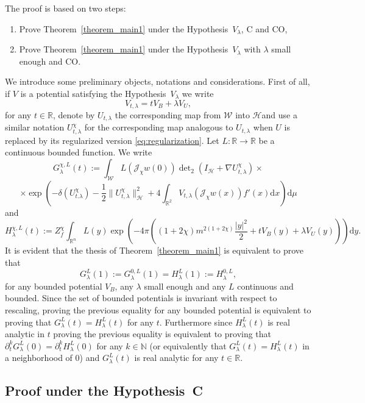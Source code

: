 \documentclass[a4paper,10pt]{article}
\newcommand{\assign}{:=}
\newcommand{\mathd}{\mathrm{d}}
\begin{document}
The proof is based on two steps:
\begin{enumerate}
  \item Prove Theorem~\ref{theorem_main1} under the Hypothesis~$V_{\lambda}$,
  C and CO,
  
  \item Prove Theorem~\ref{theorem_main1} under the Hypothesis~$V_{\lambda}$
  with $\lambda$ small enough and CO.
\end{enumerate}
We introduce some preliminary objects, notations and considerations. First of
all, if $V$ is a potential satisfying the Hypothesis~$V_{\lambda}$ we write
\[ V_{t, \lambda} = t V_B + \lambda V_U, \]
for any $t \in \mathbb{R}$, denote by $U_{t, \lambda}$ the corresponding map
from $\mathcal{W}$ into $\mathcal{H}$and use a similar notation $U^{\chi}_{t,
\lambda}$ for the corresponding map analogous to $U_{t, \lambda}$ when $U$ is
replaced by its regularized version {\eqref{eq:regularization}}. Let $L :
\mathbb{R} \rightarrow \mathbb{R}$ be a continuous bounded function. We write
\[ G^{\chi, L}_{\lambda} (t) \assign \int_{\mathcal{W}} L (\mathcal{J}_{\chi}
   w (0)) \det\nolimits_2 (I_{\mathcal{H}} + \nabla U_{t, \lambda}^{\chi}) \times \]
\[ \times \exp \left( - \delta (U^{\chi}_{t. \lambda}) - \frac{1}{2} \|U_{t,
   \lambda}^{\chi} \|^2_{\mathcal{H}} + 4 \int_{\mathbb{R}^2} V_{t, \lambda}
   (\mathcal{J}_{\chi} w (x)) f' (x) \mathd x \right) \mathd \mu \]
and
\[ H^{\chi, L}_{\lambda} (t) \assign Z_f^{\chi} \int_{\mathbb{R}^n} L (y) \exp
   \left( - 4 \pi \left( (1 + 2 \chi) m^{2 (1 + 2 \chi)} \frac{| y |^2}{2} + t
   V_B (y) + \lambda V_U (y) \right) \right) \mathd y. \]
It is evident that the thesis of Theorem~\ref{theorem_main1} is equivalent to
prove that
\[ G^L_{\lambda} (1) \assign G^{0, L}_{\lambda} (1) = H^L_{\lambda} (1)
   \assign H^{0, L}_{\lambda}, \]
for any bounded potential $V_B$, any $\lambda$ small enough and any $L$
continuous and bounded. Since the set of bounded potentials is invariant with
respect to rescaling, proving the previous equality for any bounded potential
is equivalent to proving that $G^L_{\lambda} (t) = H^L_{\lambda} (t)$ for any
$t$. Furthermore since $H^L_{\lambda} (t)$ is real analytic in $t$ proving the
previous equality is equivalent to proving that $\partial_t^k G^L_{\lambda}
(0) = \partial^k_t H^L_{\lambda} (0)$ for any $k \in \mathbb{N}$ (or
equivalently that $G^L_{\lambda} (t) = H^L_{\lambda} (t)$ in a neighborhood of
$0$) and $G^L_{\lambda} (t)$ is real analytic for any $t \in \mathbb{R}.$

\subsection{Proof under the Hypothesis~C}
\end{document}
